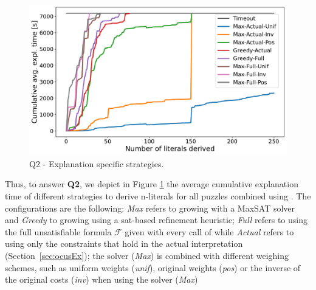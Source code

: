 \begin{figure}[ht]
  \centering
  \includegraphics[width=\columnwidth]{figures_post_paper/cumul_grow_avg_time_lits_derived.pdf}
  \caption{Q2 - Explanation specific \grow strategies.}
  \label{fig:grow_strategies}
\end{figure}


Thus, to answer \textbf{Q2}, we depict in Figure \ref{fig:grow_strategies} the average cumulative explanation time of different \grow strategies to derive n-literals for all puzzles combined using \comus.
The configurations are the following: 
\emph{Max} refers to growing with a MaxSAT solver and \emph{Greedy} to growing using a sat-based refinement heuristic;
\emph{Full} refers to using the full unsatisfiable formula $\mathcal{F}$ given with every call of \comus while \emph{Actual} refers to using only the constraints that hold in the actual interpretation (Section~\ref{sec:ocusEx}); 
the \maxsat solver (\emph{Max}) is combined with different weighing schemes, such as uniform weights (\emph{unif}), original weights (\emph{pos}) or the inverse of the original costs (\emph{inv}) when using the \maxsat solver (\emph{Max})


